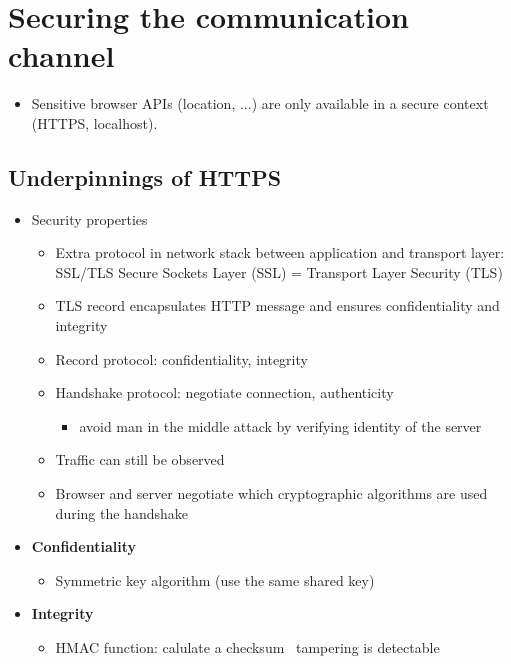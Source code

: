 \documentclass[12pt,titlepage,a4paper]{report}
\begin{document}
		\section{Securing the communication channel}
			\begin{itemize}
				\item Sensitive browser APIs (location, ...) are only available in a secure context (HTTPS, localhost).
			\end{itemize}

			\subsection{Underpinnings of HTTPS}
			\begin{itemize}
				\item Security properties
				\begin{itemize}
					\item Extra protocol in network stack between application and transport layer: SSL/TLS
						\subitem Secure Sockets Layer (SSL) = Transport Layer Security (TLS)
					\item TLS record encapsulates HTTP message and ensures confidentiality and integrity
					\item Record protocol: confidentiality, integrity
					\item Handshake protocol: negotiate connection, authenticity
					\begin{itemize}
						\item avoid man in the middle attack by verifying identity of the server
					\end{itemize}
					\item Traffic can still be observed
					\item Browser and server negotiate which cryptographic algorithms are used during the handshake
				\end{itemize}
			
				\item \textbf{Confidentiality}
				\begin{itemize}
					\item Symmetric key algorithm (use the same shared key)
				\end{itemize}
			
				\item \textbf{Integrity}
				\begin{itemize}
					\item HMAC function: calulate a checksum \textrightarrow \, tampering is detectable
				\end{itemize}
			

\end{itemize}
\end{document}
